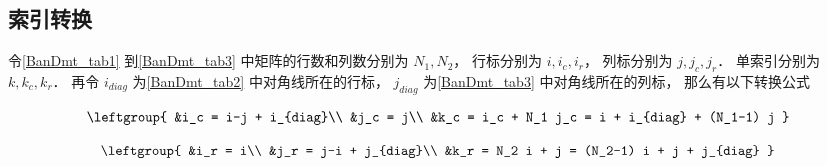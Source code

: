 \subsection{索引转换}

令\autoref{BanDmt_tab1} 到\autoref{BanDmt_tab3} 中矩阵的行数和列数分别为 $N_1, N_2$， 行标分别为 $i, i_c, i_r$， 列标分别为 $j, j_c, j_r$． 单索引分别为 $k, k_c, k_r$． 再令 $i_{diag}$ 为\autoref{BanDmt_tab2} 中对角线所在的行标， $j_{diag}$ 为\autoref{BanDmt_tab3} 中对角线所在的列标， 那么有以下转换公式

\begin{equation}
\leftgroup{
&i_c = i-j + i_{diag}\\
&j_c = j\\
&k_c = i_c + N_1 j_c = i + i_{diag} + (N_1-1) j
}\end{equation}

\begin{equation}
\leftgroup{
&i_r = i\\
&j_r = j-i + j_{diag}\\
&k_r = N_2 i + j = (N_2-1) i + j + j_{diag}
}\end{equation}
